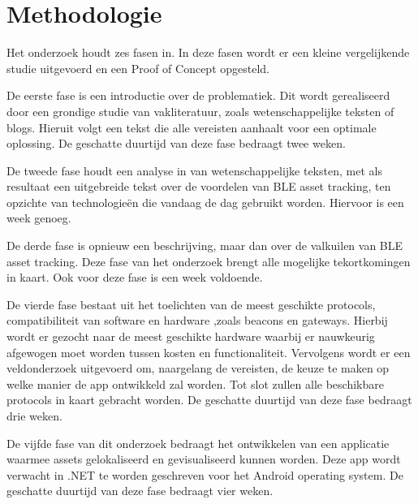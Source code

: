 

\section{Methodologie}%
\label{sec:methodologie}

Het onderzoek houdt zes fasen in. In deze fasen wordt er een kleine vergelijkende studie uitgevoerd en een Proof of Concept opgesteld.

De eerste fase is een introductie over de problematiek. Dit wordt gerealiseerd door een grondige studie van vakliteratuur, zoals wetenschappelijke teksten of blogs. Hieruit volgt een tekst die alle vereisten aanhaalt voor een optimale oplossing. De geschatte duurtijd van deze fase bedraagt twee weken.

De tweede fase houdt een analyse in van wetenschappelijke teksten, met als resultaat een uitgebreide tekst over de voordelen van BLE asset tracking, ten opzichte van technologieën die vandaag de dag gebruikt worden. Hiervoor is een week genoeg.

De derde fase is opnieuw een beschrijving, maar dan over de valkuilen van BLE asset tracking. Deze fase van het onderzoek brengt alle mogelijke tekortkomingen in kaart. Ook voor deze fase is een week voldoende.

De vierde fase bestaat uit het toelichten van de meest geschikte protocols, compatibiliteit van software en hardware ,zoals beacons en gateways. Hierbij wordt er gezocht naar de meest geschikte hardware waarbij er nauwkeurig afgewogen moet worden tussen kosten en functionaliteit. Vervolgens wordt er een veldonderzoek uitgevoerd om, naargelang de vereisten, de keuze te maken op welke manier de app ontwikkeld zal worden. Tot slot zullen alle beschikbare protocols in kaart gebracht worden. De geschatte duurtijd van deze fase bedraagt drie weken.

De vijfde fase van dit onderzoek bedraagt het ontwikkelen van een applicatie waarmee assets gelokaliseerd en gevisualiseerd kunnen worden. Deze app wordt verwacht in .NET te worden geschreven voor het Android operating system. De geschatte duurtijd van deze fase bedraagt vier weken.


